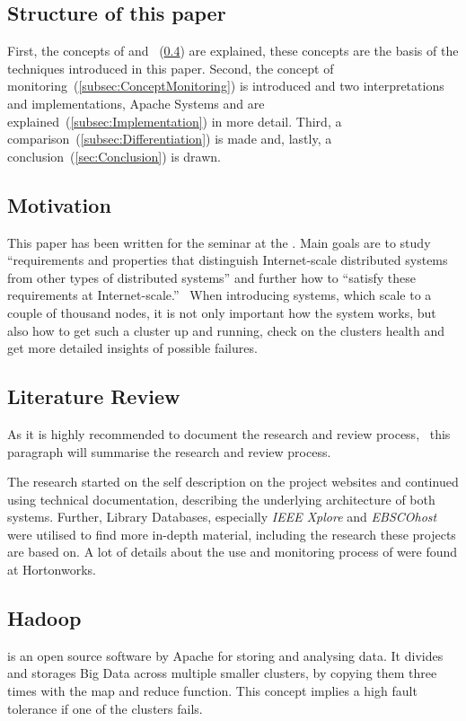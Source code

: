 \subsection{Structure of this paper}
First, the concepts of \hadoop and \mr~(\ref{subsec:Hadoop}) are explained, these concepts are the basis of the techniques introduced in this paper. 
Second, the concept of monitoring~(\ref{subsec:ConceptMonitoring}) is introduced and two interpretations and implementations, Apache Systems \amb and \chuk are explained~(\ref{subsec:Implementation}) in more detail. 
Third, a comparison~(\ref{subsec:Differentiation}) is made and, lastly, a conclusion~(\ref{sec:Conclusion}) is drawn.

\subsection{Motivation}
This paper has been written for the seminar \isdslong at the \tum. Main goals are to study ``requirements and properties that distinguish Internet-scale distributed systems from other types of distributed systems'' and further how to ``satisfy these requirements at Internet-scale.''~\cite{SeminarInfo} 
When introducing systems, which scale to a couple of thousand nodes, it is not only important how the system works, but also how to get such a cluster up and running, check on the clusters health and get more detailed insights of possible failures.

\subsection{Literature Review}
As it is highly recommended to document the research and review process,~\cite{brocke09} this paragraph will summarise the research and review process.

The research started on the self description on the project websites and continued using technical documentation, describing the underlying architecture of both systems.
Further, Library Databases, especially \emph{IEEE Xplore} and \emph{EBSCOhost} were utilised to find more in-depth material, including the research these projects are based on. A lot of details about the use and monitoring process of \amb were found at Hortonworks.
	
\subsection{Hadoop}
\label{subsec:Hadoop}
\hadoopshort is an open source software by Apache for storing and analysing data.\cite{Dagli2014} It divides and storages Big Data across multiple smaller clusters, by copying them three times with the map and reduce function. This concept implies a high fault tolerance if one of the clusters fails.\cite{Dagli2014}

